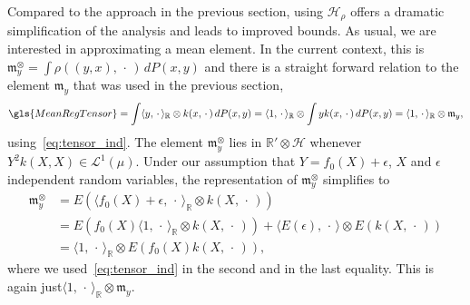 \documentclass[AHL,Unicode,longabstracts,published]{cedram}
\theoremstyle{remark}
\newcommand{\R}{\mathbb{R}}
\newcommand{\dR}{{\R'}}
\newcommand{\cH}{\mathcal{H}}
\newcommand{\clL}{\mathcal{L}}
\newcommand{\mean}{\mathfrak{m}}
\begin{document}
Compared to the approach in the previous section, using $\cH_\rho$ offers a dramatic simplification of the analysis and leads to improved bounds. As usual, we are interested in approximating a mean element. In the current context, this is $\mean^\otimes_y = \int \rho((y,x), \,\cdot\,) \, dP(x,y)$ and there is a straight forward relation to the element $\mean_y$ that was used in the previous section,
\[
\gls{MeanRegTensor}= \int \langle y, \,\cdot\, \rangle_\R \otimes k(x,\,\cdot\,) \, dP(x,y) = \langle 1,\,\cdot\, \rangle_\R \otimes
\int y k(x,\,\cdot\,) \, dP(x,y) = \langle 1,\,\cdot\, \rangle_\R \otimes \mean_y,
\]
using~\eqref{eq:tensor_ind}. The element $\mean^\otimes_y$ lies in $\dR \otimes \cH$ whenever $Y^2 k(X,X) \in \clL^1(\mu)$. Under our assumption that $Y = f_0(X) + \epsilon$, $X$ and $\epsilon$ independent random variables, the representation of $\mean_y^\otimes$ simplifies to
\begin{align*}
\mean_y^\otimes &= E(\langle f_0(X) + \epsilon,\,\cdot\, \rangle_\R \otimes k(X,\,\cdot\,)) \\
&= E(f_0(X) \langle 1, \,\cdot\, \rangle_\R \otimes k(X,\,\cdot\,)) + \langle E(\epsilon), \,\cdot\, \rangle \otimes E(k(X,\,\cdot\,)) \\
&= \langle 1,\,\cdot\, \rangle_\R \otimes E(f_0(X) k(X,\,\cdot\,)),
\end{align*}
where we used~\eqref{eq:tensor_ind} in the second and in the last equality. This is again just\linebreak $\langle 1, \,\cdot\, \rangle_\R \otimes \mean_y$.
\end{document}
